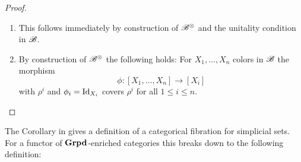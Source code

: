 \begin{proof}
\begin{enumerate}
        \item[3. + 4.] This follows immediately by construction of $\mathscr{B}^{\otimes}$ and the
        unitality condition in $\mathscr{B}$.
        \item[5.] By construction of $\mathscr{B}^{\otimes}$ the following holds: For $X_1, \dots,
        X_n$ colors in $\mathscr{B}$ the morphism
        \[
            \phi \colon [X_1, \dots, X_n] \to [X_i]
        \]
        with $\rho^i$ and $\phi_i = \operatorname{Id}_{X_i}$ covers $\rho^i$ for all $1 \leq i
        \leq n$.
    \end{enumerate}
\end{proof}

The Corollary in \cite[Corollary 2.4.6.5]{hht} gives a definition of a
categorical fibration for simplicial sets. For a functor of $\operatorname{\textbf{Grpd}}$-enriched
categories this breaks down to the following definition:

